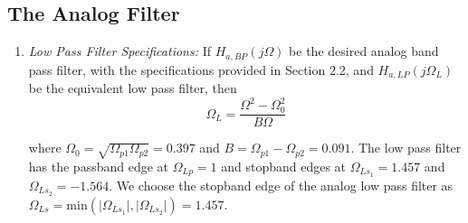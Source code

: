 \documentclass{article}
\begin{document}
\subsection{The Analog Filter}
\begin{enumerate}

\item {\em Low Pass Filter Specifications:}  If $H_{a, BP}(j\Omega)$ be the desired analog band
pass filter,  with the specifications provided in Section 2.2, and $H_{a,LP}(j\Omega_L)$ 
be the equivalent low pass filter, then
\begin{equation}
\label{transition}
\Omega_L = \frac{\Omega^2 - \Omega_0^2}{B\Omega}
\end{equation}

where $\Omega_0 = \sqrt{\Omega_{p1}\Omega_{p2}} = 0.397$ and $B = \Omega_{p1} - \Omega_{p2} = 0.091$.  The low pass filter has
the passband edge at $\Omega_{Lp} = 1$ and stopband edges at $\Omega_{Ls_1} = 1.457$ and $\Omega_{Ls_2} = -1.564$.  We choose the stopband edge of the analog low pass filter as $\Omega_{Ls} = \mbox{min}(\vert \Omega_{Ls_1}\vert,\vert \Omega_{Ls_2}\vert) = 1.457$.


\end{enumerate}
\end{document}

